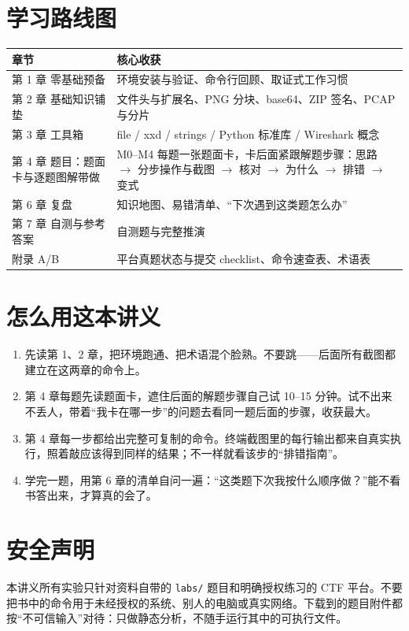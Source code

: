 \documentclass[UTF8,12pt,oneside]{ctexbook}
\begin{document}
\section*{学习路线图}
\begin{center}
\begin{tabular}{p{}p{}}
\toprule
章节 & 核心收获 \\
\midrule
第 1 章 零基础预备 & 环境安装与验证、命令行回顾、取证式工作习惯 \\
第 2 章 基础知识铺垫 & 文件头与扩展名、PNG 分块、base64、ZIP 签名、PCAP 与分片 \\
第 3 章 工具箱 & file / xxd / strings / Python 标准库 / Wireshark 概念 \\
第 4 章 题目：题面卡与逐题图解带做 & M0--M4 每题一张题面卡，卡后面紧跟解题步骤：思路 $\rightarrow$ 分步操作与截图 $\rightarrow$ 核对 $\rightarrow$ 为什么 $\rightarrow$ 排错 $\rightarrow$ 变式 \\
第 6 章 复盘 & 知识地图、易错清单、“下次遇到这类题怎么办” \\
第 7 章 自测与参考答案 & 自测题与完整推演 \\
附录 A/B & 平台真题状态与提交 checklist、命令速查表、术语表 \\
\bottomrule
\end{tabular}
\end{center}

\section*{怎么用这本讲义}
\begin{enumerate}[label=\arabic*.]
\item 先读第 1、2 章，把环境跑通、把术语混个脸熟。不要跳——后面所有截图都建立在这两章的命令上。
\item 第 4 章每题先读题面卡，遮住后面的解题步骤自己试 10--15 分钟。试不出来不丢人，带着“我卡在哪一步”的问题去看同一题后面的步骤，收获最大。
\item 第 4 章每一步都给出完整可复制的命令。终端截图里的每行输出都来自真实执行，照着敲应该得到同样的结果；不一样就看该步的“排错指南”。
\item 学完一题，用第 6 章的清单自问一遍：“这类题下次我按什么顺序做？”能不看书答出来，才算真的会了。
\end{enumerate}

\section*{安全声明}
本讲义所有实验只针对资料自带的 \verb|labs/| 题目和明确授权练习的 CTF 平台。不要把书中的命令用于未经授权的系统、别人的电脑或真实网络。下载到的题目附件都按“不可信输入”对待：只做静态分析，不随手运行其中的可执行文件。
\end{document}
